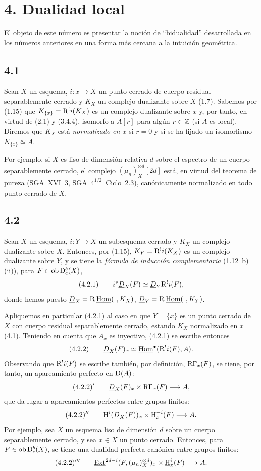 \section*{4. Dualidad local}

El objeto de este número es presentar la noción de ``bidualidad'' desarrollada en los números anteriores en una forma más cercana a la intuición geométrica.

\subsection*{4.1}
Sean $X$ un esquema, $i : x \to X$ un punto cerrado de cuerpo residual separablemente cerrado y $K_X$ un complejo dualizante sobre $X$ (1.7). Sabemos por (1.15) que $K_{\{x\}} = \mathrm{R}^{!}i(K_X)$ es un complejo dualizante sobre $x$ y, por tanto, en virtud de (2.1) y (3.4.4), isomorfo a $A[r]$ para algún $r \in \mathbb{Z}$ (si $A$ es local). Diremos que $K_X$ está \emph{normalizado en $x$} si $r = 0$ y si se ha fijado un isomorfismo $K_{\{x\}} \simeq A$.

Por ejemplo, si $X$ es liso de dimensión relativa $d$ sobre el espectro de un cuerpo separablemente cerrado, el complejo $(\mu_n)_X^{\otimes d}[2d]$ está, en virtud del teorema de pureza (SGA~XVI~3, SGA~$4^{1/2}$~Ciclo~2.3), canónicamente normalizado en todo punto cerrado de $X$.

\subsection*{4.2}
Sean $X$ un esquema, $i : Y \to X$ un subesquema cerrado y $K_X$ un complejo dualizante sobre $X$. Entonces, por (1.15), $K_Y = \mathrm{R}^{!}i(K_X)$ es un complejo dualizante sobre $Y$, y se tiene la \emph{fórmula de inducción complementaria} (1.12~b)(ii)), para $F \in \operatorname{ob} \mathrm{D}_c^b(X)$,
\[
(4.2.1)\qquad i^*\underline{D}_X(F)\simeq\underline{D}_Y\mathrm{R}^{!}i(F),
\]
donde hemos puesto $\underline{D}_X = \mathrm{R}\,\underline{\operatorname{Hom}}(\ ,K_X)$, $\underline{D}_Y = \R\,\underline{\Hom}(\ ,K_Y)$.

Apliquemos en particular (4.2.1) al caso en que $Y = \{x\}$ es un punto cerrado de $X$ con cuerpo residual separablemente cerrado, estando $K_X$ normalizado en $x$ (4.1). Teniendo en cuenta que $A_x$ es inyectivo, (4.2.1) se escribe entonces
\[
(4.2.2)\qquad \underline{D}_X(F)_x\simeq\underline{\operatorname{Hom}}^{\bullet}(\mathrm{R}^{!}i(F),A).
\]
Observando que $\mathrm{R}^{!}i(F)$ se escribe también, por definición, $\mathrm{R}\Gamma_x(F)$, se tiene, por tanto, un apareamiento perfecto en $\mathrm{D}(A)$:
\[
(4.2.2)'\qquad \underline{D}_X(F)_x\times \mathrm{R}\Gamma_x(F)\longrightarrow A,
\]
que da lugar a apareamientos perfectos entre grupos finitos:
\[
(4.2.2)''\qquad \underline{\mathrm H}^i(\underline{D}_X(F))_x\times \underline{\mathrm H}_x^{-i}(F)\longrightarrow A.
\]
Por ejemplo, sea $X$ un esquema liso de dimensión $d$ sobre un cuerpo separablemente cerrado, y sea $x \in X$ un punto cerrado. Entonces, para $F \in \operatorname{ob} \mathrm{D}_c^b(X)$, se tiene una dualidad perfecta canónica entre grupos finitos:
\[
(4.2.2)'''\qquad \underline{\operatorname{Ext}}^{2d-i}(F,(\mu_n)_X^{\otimes d})_x\times \underline{\mathrm H}_x^i(F)\longrightarrow A.
\]

